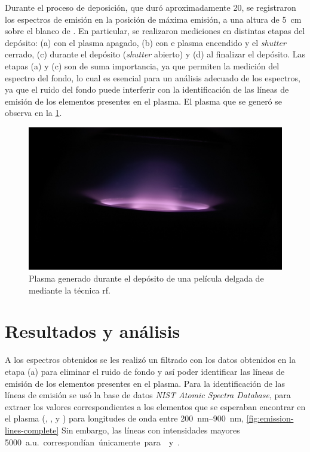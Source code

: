 \documentclass[12pt]{IEEEtran}
\begin{document}
Durante el proceso de deposición, que duró aproximadamente \qty{20}{\min},
se registraron los espectros de emisión en la posición de máxima emisión,
a una altura de \qty{5}{\cm} sobre el blanco de . En particular,
se realizaron mediciones en distintas etapas del depósito: (a) con el plasma apagado, (b) con e plasma encendido y el \emph{shutter} cerrado, (c) durante el depósito (\emph{shutter} abierto) y (d) al finalizar el depósito.
Las etapas (a) y (c) son de suma importancia, ya que permiten la medición del espectro del fondo, lo cual es esencial para un análisis adecuado de los espectros, ya que el ruido del fondo puede interferir con la identificación de las líneas de emisión de los elementos presentes en el plasma. El plasma que se generó se observa en la \cref{fig:plasma}.

\begin{figure}[htb]
	\centering
	\includegraphics[width=0.9\linewidth]{PLASMA.jpg}
	\caption{Plasma generado durante el depósito de una película delgada de  mediante la técnica rf.}
	\label{fig:plasma}
\end{figure}

\section{Resultados y análisis}

A los espectros obtenidos se les realizó un filtrado con los datos obtenidos
en la etapa (a) para eliminar el ruido de fondo y
así poder identificar las líneas de emisión de los elementos presentes en el plasma.
Para la identificación de las líneas de emisión se usó la base de datos
\emph{NIST Atomic Spectra Database}\cite{nist-asd-lines}, para
extraer los valores correspondientes a los elementos que se esperaban encontrar
en el plasma (, ,  y ) para longitudes de onda entre \qtyrange{200}{900}{\nm}, \cref{fig:emission-lines-complete} Sin embargo, las líneas con intensidades mayores \qty{5000}{a.u.} correspondían únicamente para  y .
\end{document}
